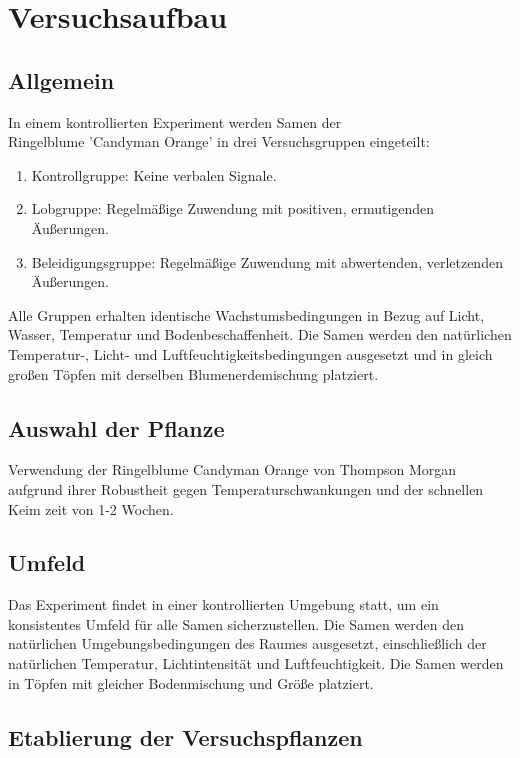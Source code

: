 \section{Versuchsaufbau}
    \subsection{Allgemein}
    In einem kontrollierten Experiment werden Samen der \\ Ringelblume 'Candyman Orange' in drei Versuchsgruppen eingeteilt:
    \begin{enumerate}
        \item Kontrollgruppe: Keine verbalen Signale.
        \item Lobgruppe: Regelmäßige Zuwendung mit positiven, ermutigenden Äußerungen.
        \item Beleidigungsgruppe: Regelmäßige Zuwendung mit abwertenden, verletzenden Äußerungen.
    \end{enumerate} 
    
    Alle Gruppen erhalten identische Wachstumsbedingungen in Bezug auf Licht, Wasser, Temperatur und Bodenbeschaffenheit. Die Samen werden den natürlichen Temperatur-, Licht- und Luftfeuchtigkeitsbedingungen ausgesetzt und in gleich großen Töpfen mit derselben Blumenerdemischung platziert. \\

    \subsection{Auswahl der Pflanze}
    Verwendung der Ringelblume Candyman Orange von Thompson Morgan aufgrund ihrer Robustheit gegen Temperaturschwankungen und der schnellen Keim zeit von 1-2 Wochen.

    \subsection{Umfeld}
    Das Experiment findet in einer kontrollierten Umgebung statt, um ein konsistentes Umfeld für alle Samen sicherzustellen. Die Samen werden den natürlichen Umgebungsbedingungen des Raumes ausgesetzt, einschließlich der natürlichen Temperatur, Lichtintensität und Luftfeuchtigkeit. Die Samen werden in Töpfen mit gleicher Bodenmischung und Größe platziert.

    \subsection{Etablierung der Versuchspflanzen}
